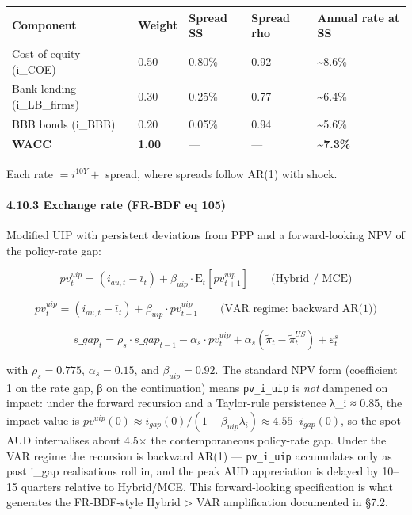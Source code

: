 \documentclass[
]{article}
\newcounter{none} %
\begin{document}
{\def\LTcaptype{none} %
\begin{longtable}[]{@{}lllll@{}}
\toprule\noalign{}
Component & Weight & Spread SS & Spread rho & Annual rate at SS \\
\midrule\noalign{}
\endhead
\bottomrule\noalign{}
\endlastfoot
Cost of equity (i\_COE) & 0.50 & 0.80\% & 0.92 & \textasciitilde8.6\% \\
Bank lending (i\_LB\_firms) & 0.30 & 0.25\% & 0.77 &
\textasciitilde6.4\% \\
BBB bonds (i\_BBB) & 0.20 & 0.05\% & 0.94 & \textasciitilde5.6\% \\
\textbf{WACC} & \textbf{1.00} & --- & --- &
\textbf{\textasciitilde7.3\%} \\
\end{longtable}
}

Each rate \(= i^{10Y} +\) spread, where spreads follow AR(1) with shock.

\paragraph{4.10.3 Exchange rate (FR-BDF eq
105)}\label{exchange-rate-fr-bdf-eq-105}

Modified UIP with persistent deviations from PPP and a forward-looking
NPV of the policy-rate gap:

\[pv^{uip}_t = (i_{au,t} - \bar{\iota}_t) + \beta_{uip} \cdot \mathrm{E}_t[pv^{uip}_{t+1}] \qquad \text{(Hybrid / MCE)}\]

\[pv^{uip}_t = (i_{au,t} - \bar{\iota}_t) + \beta_{uip} \cdot pv^{uip}_{t-1} \qquad \text{(VAR regime: backward AR(1))}\]

\[s\_gap_t = \rho_s \cdot s\_gap_{t-1} - \alpha_s \cdot pv^{uip}_t + \alpha_s (\tilde{\pi}_t - \tilde{\pi}^{US}_t) + \varepsilon^s_t\]

with \(\rho_s = 0.775\), \(\alpha_s = 0.15\), and
\(\beta_{uip} = 0.92\). The standard NPV form (coefficient 1 on the rate
gap, β on the continuation) means \texttt{pv\_i\_uip} is \emph{not}
dampened on impact: under the forward recursion and a Taylor-rule
persistence λ\_i ≈ 0.85, the impact value is
\(pv^{uip}(0) \approx i_{gap}(0) / (1 - \beta_{uip} \lambda_i) \approx 4.55 \cdot i_{gap}(0)\),
so the spot AUD internalises about 4.5× the contemporaneous policy-rate
gap. Under the VAR regime the recursion is backward AR(1) ---
\texttt{pv\_i\_uip} accumulates only as past i\_gap realisations roll
in, and the peak AUD appreciation is delayed by 10--15 quarters relative
to Hybrid/MCE. This forward-looking specification is what generates the
FR-BDF-style Hybrid \textgreater{} VAR amplification documented in §7.2.
\end{document}
